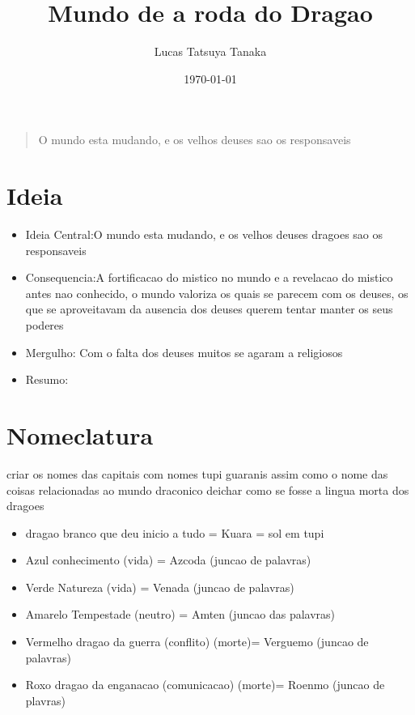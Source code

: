 \documentclass{book}
\title{Mundo de a roda do Dragao}
\author{Lucas Tatsuya Tanaka}
\date{\today}
\begin{document}
\maketitle

\vspace*{\fill} 
\begin{quote} 
\centering 
\Large O mundo esta mudando, e os velhos deuses sao os responsaveis
\end{quote}
\vspace*{\fill}

\tableofcontents
\chapter{Ideia}
\begin{itemize}
    \item Ideia Central:O mundo esta mudando, e os velhos deuses dragoes sao os responsaveis
    \item Consequencia:A fortificacao do mistico no mundo e a revelacao do mistico antes nao 
        conhecido, o mundo valoriza os quais se parecem com os deuses, os que se aproveitavam 
        da ausencia dos deuses querem tentar manter os seus poderes 
    \item Mergulho: Com o falta dos deuses muitos se agaram a religiosos 
    \item Resumo:
\end{itemize}

\chapter{Nomeclatura}

criar os nomes das capitais com nomes tupi guaranis assim como o nome das coisas relacionadas ao
mundo draconico deichar como se fosse a lingua morta dos dragoes 

\begin{itemize}
      \item  dragao branco que deu inicio a tudo = Kuara = sol em tupi
      \item  Azul conhecimento (vida) =  Azcoda (juncao de palavras)
      \item  Verde Natureza (vida) = Venada (juncao de palavras)
      \item  Amarelo Tempestade (neutro) = Amten (juncao das palavras)
      \item  Vermelho dragao da guerra (conflito) (morte)= Verguemo (juncao de palavras)
      \item  Roxo dragao da enganacao (comunicacao) (morte)= Roenmo (juncao de plavras)
\end{itemize}
\end{document}
